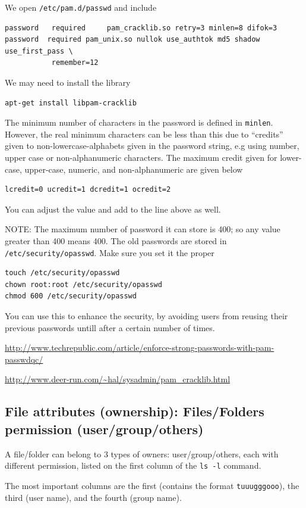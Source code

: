 We open \verb!/etc/pam.d/passwd! and include

\begin{verbatim}
password   required     pam_cracklib.so retry=3 minlen=8 difok=3
password  required pam_unix.so nullok use_authtok md5 shadow use_first_pass \
           remember=12
\end{verbatim}
We may need to install the library
\begin{verbatim}
apt-get install libpam-cracklib
\end{verbatim}

The minimum number of characters in the password is defined in \verb!minlen!.
However, the real minimum characters can be less than this due to ``credits''
given to non-lowercase-alphabets given in the password string, e.g using number,
upper case or non-alphanumeric characters. The maximum credit given for
lower-case, upper-case, numeric, and non-alphanumeric are given below
\begin{verbatim}
lcredit=0 ucredit=1 dcredit=1 ocredit=2
\end{verbatim}
You can adjust the value and add to the line above as well.

NOTE: The maximum number of password it can store is 400; so any value greater
than 400 means 400. The old passwords are stored in
\verb!/etc/security/opasswd!. Make sure you set it the proper 
\begin{verbatim}
touch /etc/security/opasswd
chown root:root /etc/security/opasswd
chmod 600 /etc/security/opasswd
\end{verbatim}
You can use this to enhance the security, by avoiding users from reusing their
previous passwords untill after a certain number of times.




\url{http://www.techrepublic.com/article/enforce-strong-passwords-with-pam-passwdqc/}

\url{http://www.deer-run.com/~hal/sysadmin/pam_cracklib.html}


\subsection{File attributes (ownership): Files/Folders permission
(user/group/others)}

A file/folder can belong to 3 types of owners: user/group/others, each with
different permission, listed on the first column of the \verb!ls -l! command.

The most important columns are the first (contains the format
\verb!tuuugggooo!), the third (user name), and the fourth (group name).

